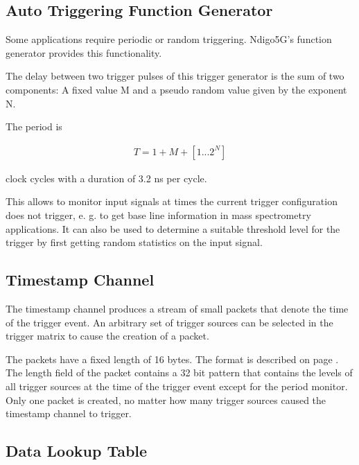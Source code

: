 	\subsection{Auto Triggering Function Generator\label{cp:AutoTriggeringFunctionGenerator}}
	
		Some applications require periodic or random triggering. Ndigo5G's function generator provides this functionality.\par

		The delay between two trigger pulses of this trigger generator is the sum of two components: A fixed value M and a pseudo random value given by the exponent N. \par

		The period is

		\begin{align}
			T = 1 + M + [1...2^N]
		\end{align}

		clock cycles with a duration of 3.2 ns per cycle.\par
		
		This allows to monitor input signals at times the current trigger configuration does not trigger, e. g. to get base line information in mass spectrometry applications. It can also be used to determine a suitable threshold level for the trigger by first getting random statistics on the input signal.	
	
	\subsection{Timestamp Channel}

		The timestamp channel produces a stream of small packets that denote the time of the trigger event. An arbitrary set of trigger sources can be selected in the trigger matrix to cause the creation of a packet.\par
		
		The packets have a fixed length of 16 bytes. The format is described on page \pageref{cp:packetformat}. The length field of the packet contains a 32 bit pattern that contains the levels of all trigger sources at the time of the trigger event except for the period monitor. Only one packet is created, no matter how many trigger sources caused the timestamp channel to trigger.	
	
	\subsection{Data Lookup Table}
	
